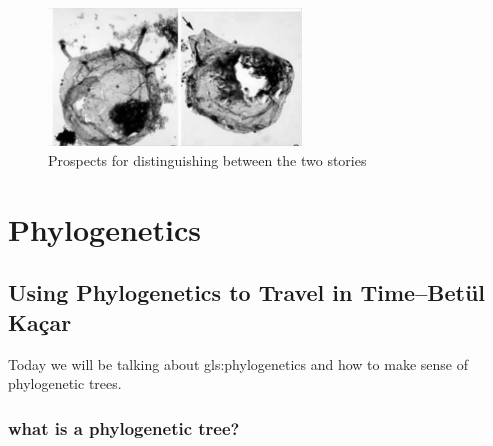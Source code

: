 \documentclass[]{article}
\begin{document}
\begin{figure}[H]
	\begin{center}
		\caption[Prospects for distinguishing between the two stories]{Prospects for distinguishing between the two stories\cite{javaux2003recognizing}}\label{fig:Javaux}
		\includegraphics[width=0.6\textwidth]{Javaux}
	\end{center}
\end{figure}
  

\section{Phylogenetics}


\subsection[Using Phylogenetics to Travel in Time]{Using Phylogenetics to Travel in Time--Bet{\"u}l Ka{\c c}ar}

Today we will be talking about \gls{gls:phylogenetics} and how to make sense of phylogenetic trees.
\subsubsection{what is a phylogenetic tree?}
\end{document}

